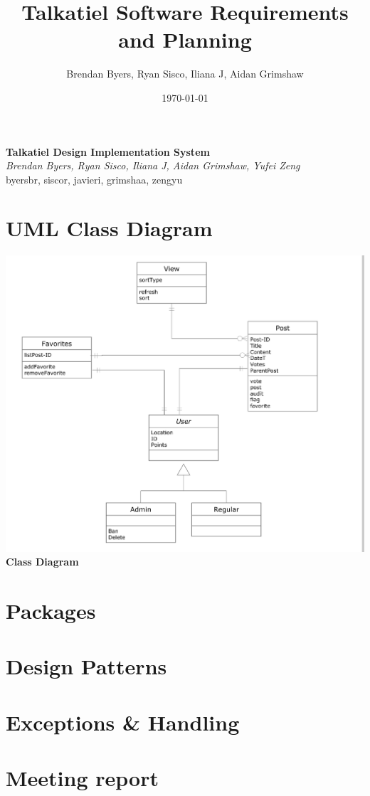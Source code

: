 \documentclass[12pt]{article}
\title{Talkatiel Software Requirements and Planning}
\author{Brendan Byers, Ryan Sisco, Iliana J, Aidan Grimshaw}
\date{\today}
\begin{document}
\begin{center}
      \Large\textbf{Talkatiel Design Implementation System}\\
      \large\textit{Brendan Byers, Ryan Sisco, Iliana J, Aidan Grimshaw, Yufei Zeng}\\
      \large{byersbr, siscor, javieri, grimshaa, zengyu}\\
   \end{center}

\tableofcontents

\section{UML Class Diagram}
\begin{center}
\includegraphics[scale=0.25]{img/uml/ClassDiagram}\linebreak
\textbf{Class Diagram}
  \end{center}

\section{Packages}

\section{Design Patterns}

\section{Exceptions & Handling}

\section{Meeting report}
\end{document}

